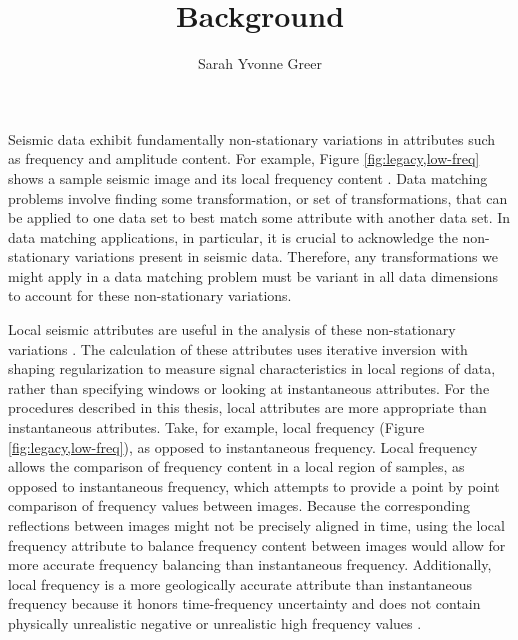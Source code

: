 \title{Background}
\author{Sarah Yvonne Greer}
\label{ch:chapter-background}

\maketitle
{}
Seismic data exhibit fundamentally non-stationary variations in attributes such as frequency and amplitude content.
For example, Figure \ref{fig:legacy,low-freq} shows a sample seismic image and its local frequency content \cite[]{locfreq}.
Data matching problems involve finding some transformation, or set of transformations, that can be applied to one data set to best match some attribute with another data set.
In data matching applications, in particular, it is crucial to acknowledge the non-stationary variations present in seismic data.
Therefore, any transformations we might apply in a data matching problem must be variant in all data dimensions to account for these non-stationary variations.

Local seismic attributes are useful in the analysis of these non-stationary variations \cite[]{attr}.
The calculation of these attributes uses iterative inversion with shaping regularization \cite[]{shap} to measure signal characteristics in local regions of data, rather than specifying windows or looking at instantaneous attributes.
For the procedures described in this thesis, local attributes are more appropriate than instantaneous attributes.
Take, for example, local frequency (Figure \ref{fig:legacy,low-freq}), as opposed to instantaneous frequency.
Local frequency allows the comparison of frequency content in a local region of samples, as opposed to instantaneous frequency, which attempts to provide a point by point comparison of frequency values between images. 
Because the corresponding reflections between images might not be precisely aligned in time, using the local frequency attribute to balance frequency content between images would allow for more accurate frequency balancing than instantaneous frequency. 
Additionally, local frequency is a more geologically accurate attribute than instantaneous frequency because it honors time-frequency uncertainty and does not contain physically unrealistic negative or unrealistic high frequency values \cite[]{attr}.

